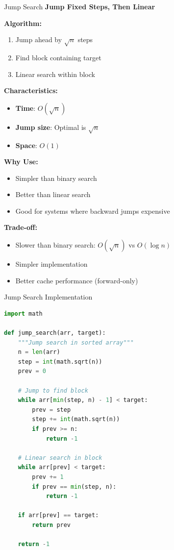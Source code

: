 \documentclass[aspectratio=169]{beamer}
\begin{document}
\begin{frame}{Jump Search}
  \textbf{Jump Fixed Steps, Then Linear}

  \vspace{0.3cm}
  \textbf{Algorithm:}
  \begin{enumerate}
    \item Jump ahead by $\sqrt{n}$ steps
    \item Find block containing target
    \item Linear search within block
  \end{enumerate}

  \vspace{0.3cm}
  \textbf{Characteristics:}
  \begin{itemize}
    \item \textbf{Time}: $O(\sqrt{n})$
    \item \textbf{Jump size}: Optimal is $\sqrt{n}$
    \item \textbf{Space}: $O(1)$
  \end{itemize}

  \vspace{0.3cm}
  \textbf{Why Use:}
  \begin{itemize}
    \item Simpler than binary search
    \item Better than linear search
    \item Good for systems where backward jumps expensive
  \end{itemize}

  \vspace{0.3cm}
  \textbf{Trade-off:}
  \begin{itemize}
    \item Slower than binary search: $O(\sqrt{n})$ vs $O(\log n)$
    \item Simpler implementation
    \item Better cache performance (forward-only)
  \end{itemize}
\end{frame}

\begin{frame}[fragile]{Jump Search Implementation}
\begin{lstlisting}[language=Python, basicstyle=\ttfamily\small]
import math

def jump_search(arr, target):
    """Jump search in sorted array"""
    n = len(arr)
    step = int(math.sqrt(n))
    prev = 0

    # Jump to find block
    while arr[min(step, n) - 1] < target:
        prev = step
        step += int(math.sqrt(n))
        if prev >= n:
            return -1

    # Linear search in block
    while arr[prev] < target:
        prev += 1
        if prev == min(step, n):
            return -1

    if arr[prev] == target:
        return prev

    return -1
\end{lstlisting}
\end{frame}
\end{document}
